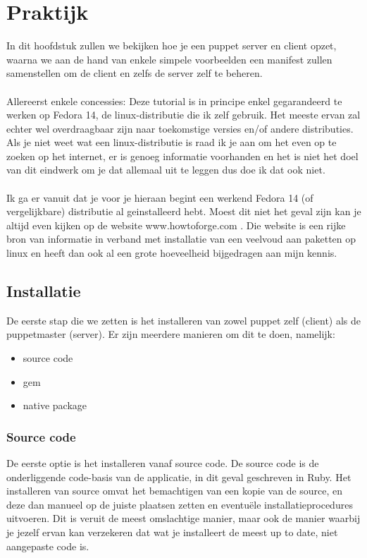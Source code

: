 \chapter{Praktijk}
In dit hoofdstuk zullen we bekijken hoe je een puppet server en client opzet, waarna we aan de hand van enkele simpele voorbeelden een manifest zullen samenstellen om de client en zelfs de server zelf te beheren.\\\\
Allereerst enkele concessies: Deze tutorial is in principe enkel gegarandeerd te werken op Fedora 14, de linux-distributie die ik zelf gebruik. Het meeste ervan zal echter wel overdraagbaar zijn naar toekomstige versies en/of andere distributies. Als je niet weet wat een linux-distributie is raad ik je aan om het even op te zoeken op het internet, er is genoeg informatie voorhanden en het is niet het doel van dit eindwerk om je dat allemaal uit te leggen dus doe ik dat ook niet.\\\\
Ik ga er vanuit dat je voor je hieraan begint een werkend Fedora 14 (of vergelijkbare) distributie al geinstalleerd hebt. Moest dit niet het geval zijn kan je altijd even kijken op de website www.howtoforge.com . Die website is een rijke bron van informatie in verband met installatie van een veelvoud aan paketten op linux en heeft dan ook al een grote hoeveelheid bijgedragen aan mijn kennis.


\section{Installatie}
De eerste stap die we zetten is het installeren van zowel puppet zelf (client) als de puppetmaster (server). Er zijn meerdere manieren om dit te doen, namelijk:
\begin{itemize}
\item source code
\item gem
\item native package
\end{itemize}

\subsection{Source code}
De eerste optie is het installeren vanaf source code. De source code is de onderliggende code-basis van de applicatie, in dit geval geschreven in Ruby. Het installeren van source omvat het bemachtigen van een kopie van de source, en deze dan manueel op de juiste plaatsen zetten en eventu\"{e}le installatieprocedures uitvoeren. Dit is veruit de meest omslachtige manier, maar ook de manier waarbij je jezelf ervan kan verzekeren dat wat je installeert de meest up to date, niet aangepaste code is.
%
